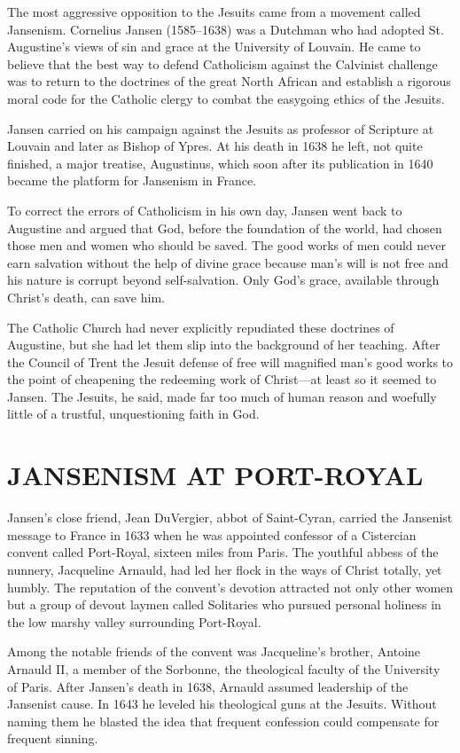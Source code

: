The most aggressive opposition to the Jesuits came from a movement called Jansenism. Cornelius
Jansen (1585–1638) was a Dutchman who had adopted St. Augustine’s views of sin and grace at the
University of Louvain. He came to believe that the best way to defend Catholicism against the
Calvinist challenge was to return to the doctrines of the great North African and establish a
rigorous moral code for the Catholic clergy to combat the easygoing ethics of the Jesuits.

Jansen carried on his campaign against the Jesuits as professor of Scripture at Louvain and later as
Bishop of Ypres. At his death in 1638 he left, not quite finished, a major treatise, Augustinus,
which soon after its publication in 1640 became the platform for Jansenism in France.

To correct the errors of Catholicism in his own day, Jansen went back to Augustine and argued that
God, before the foundation of the world, had chosen those men and women who should be saved. The
good works of men could never earn salvation without the help of divine grace because man’s will is
not free and his nature is corrupt beyond self-salvation. Only God’s grace, available through
Christ’s death, can save him.

The Catholic Church had never explicitly repudiated these doctrines of Augustine, but she had let
them slip into the background of her teaching. After the Council of Trent the Jesuit defense of free
will magnified man’s good works to the point of cheapening the redeeming work of Christ—at least so
it seemed to Jansen. The Jesuits, he said, made far too much of human reason and woefully little of
a trustful, unquestioning faith in God.

\section{JANSENISM AT PORT-ROYAL}

Jansen’s close friend, Jean DuVergier, abbot of Saint-Cyran, carried the Jansenist message to France
in 1633 when he was appointed confessor of a Cistercian convent called Port-Royal, sixteen miles
from Paris. The youthful abbess of the nunnery, Jacqueline Arnauld, had led her flock in the ways of
Christ totally, yet humbly. The reputation of the convent’s devotion attracted not only other women
but a group of devout laymen called Solitaries who pursued personal holiness in the low marshy
valley surrounding Port-Royal.

Among the notable friends of the convent was Jacqueline’s brother, Antoine Arnauld II, a member of
the Sorbonne, the theological faculty of the University of Paris. After Jansen’s death in 1638,
Arnauld assumed leadership of the Jansenist cause. In 1643 he leveled his theological guns at the
Jesuits. Without naming them he blasted the idea that frequent confession could compensate for
frequent sinning.


